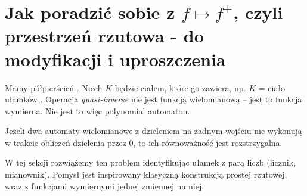 \section{Jak poradzić sobie z $f\mapsto f^+$, czyli przestrzeń rzutowa - do modyfikacji i uproszczenia}
Mamy półpierścień \Nratqr. Niech $K$ będzie ciałem, które go zawiera, np. $K$ = ciało ułamków \Zrat. Operacja \emph{quasi-inverse} nie jest funkcją wielomianową -- jest to funkcja wymierna. Nie jest to więc polynomial automaton.
\begin{tw}\label{tw::RownowaznoscAutomatowZDzieleniem}
	Jeżeli dwa automaty wielomianowe z dzieleniem na żadnym wejściu nie wykonują w  trakcie obliczeń dzielenia przez 0, to ich równoważność jest rozstrzygalna.
\end{tw}

W tej sekcji rozwiążemy ten problem identyfikując ułamek z parą liczb (licznik, mianownik). Pomysł jest inspirowany klasyczną konstrukcją prostej rzutowej, wraz z funkcjami wymiernymi jednej zmiennej na niej.
